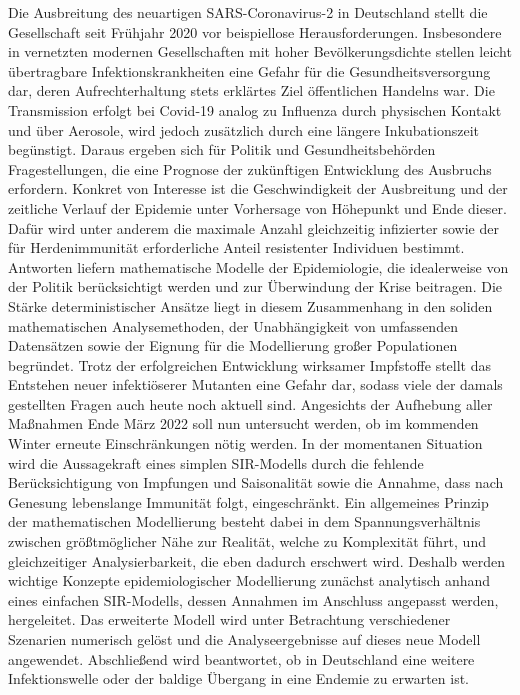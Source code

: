 \documentclass[../main.tex]{subfiles}
\begin{document}
  Die Ausbreitung des neuartigen SARS-Coronavirus-2 in Deutschland stellt die Gesellschaft seit Frühjahr 2020 vor beispiellose Herausforderungen. Insbesondere in vernetzten modernen Gesellschaften mit hoher Bevölkerungsdichte stellen leicht übertragbare Infektionskrankheiten eine Gefahr für die Gesundheitsversorgung dar, deren Aufrechterhaltung stets erklärtes Ziel öffentlichen Handelns war. Die Transmission erfolgt bei Covid-19 analog zu Influenza durch physischen Kontakt und über Aerosole, wird jedoch zusätzlich durch eine längere Inkubationszeit begünstigt.
  Daraus ergeben sich für Politik und Gesundheitsbehörden Fragestellungen, die eine Prognose der zukünftigen Entwicklung des Ausbruchs erfordern.
   Konkret von Interesse ist die Geschwindigkeit der Ausbreitung und der zeitliche Verlauf der Epidemie unter Vorhersage von Höhepunkt und Ende dieser. Dafür wird unter anderem die maximale Anzahl gleichzeitig infizierter sowie der für Herdenimmunität erforderliche Anteil resistenter Individuen bestimmt.
   Antworten liefern mathematische Modelle der Epidemiologie, die idealerweise von der Politik berücksichtigt werden und zur Überwindung der Krise beitragen. Die Stärke deterministischer Ansätze liegt in diesem Zusammenhang in den soliden mathematischen Analysemethoden, der Unabhängigkeit von umfassenden Datensätzen sowie der Eignung für die Modellierung großer Populationen begründet.
    Trotz der erfolgreichen Entwicklung wirksamer Impfstoffe stellt das Entstehen neuer infektiöserer Mutanten eine Gefahr dar, sodass viele der damals gestellten Fragen auch heute noch aktuell sind. Angesichts der Aufhebung aller Maßnahmen Ende März 2022 soll nun untersucht werden, ob im kommenden Winter erneute Einschränkungen nötig werden. In der momentanen Situation wird die Aussagekraft eines simplen SIR-Modells durch die fehlende Berücksichtigung von Impfungen und Saisonalität sowie die Annahme, dass nach Genesung lebenslange Immunität folgt, eingeschränkt. Ein allgemeines Prinzip der mathematischen Modellierung besteht dabei in dem Spannungsverhältnis zwischen größtmöglicher Nähe zur Realität, welche zu Komplexität führt, und gleichzeitiger Analysierbarkeit, die eben dadurch erschwert wird. Deshalb werden wichtige Konzepte epidemiologischer Modellierung zunächst analytisch anhand eines einfachen SIR-Modells, dessen Annahmen im Anschluss angepasst werden, hergeleitet. Das erweiterte Modell wird unter Betrachtung verschiedener Szenarien numerisch gelöst und die Analyseergebnisse auf dieses neue Modell angewendet. Abschließend wird beantwortet, ob in Deutschland eine weitere Infektionswelle oder der baldige Übergang in eine Endemie zu erwarten ist.
\end{document}
